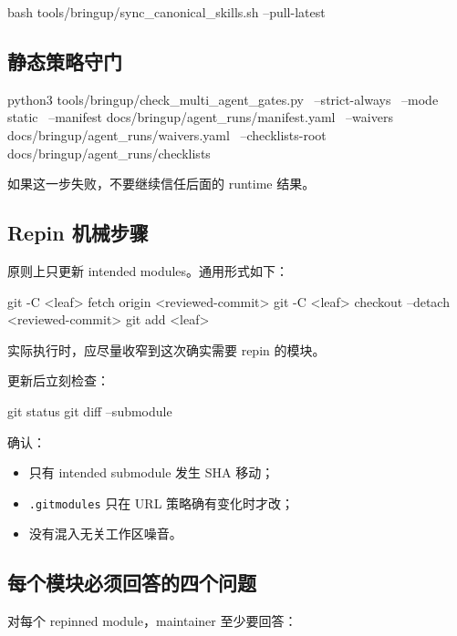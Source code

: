 \documentclass[UTF8,11pt,a4paper]{ctexart}
\begin{document}
\begin{CodeBlock}
bash tools/bringup/sync_canonical_skills.sh --pull-latest
\end{CodeBlock}

\subsection{静态策略守门}

\begin{CodeBlock}
python3 tools/bringup/check_multi_agent_gates.py \
  --strict-always \
  --mode static \
  --manifest docs/bringup/agent_runs/manifest.yaml \
  --waivers docs/bringup/agent_runs/waivers.yaml \
  --checklists-root docs/bringup/agent_runs/checklists
\end{CodeBlock}

如果这一步失败，不要继续信任后面的 runtime 结果。

\subsection{Repin 机械步骤}

原则上只更新 intended modules。通用形式如下：

\begin{CodeBlock}
git -C <leaf> fetch origin <reviewed-commit>
git -C <leaf> checkout --detach <reviewed-commit>
git add <leaf>
\end{CodeBlock}

实际执行时，应尽量收窄到这次确实需要 repin 的模块。

更新后立刻检查：

\begin{CodeBlock}
git status
git diff --submodule
\end{CodeBlock}

确认：

\begin{itemize}
  \item 只有 intended submodule 发生 SHA 移动；
  \item \texttt{.gitmodules} 只在 URL 策略确有变化时才改；
  \item 没有混入无关工作区噪音。
\end{itemize}

\subsection{每个模块必须回答的四个问题}

对每个 repinned module，maintainer 至少要回答：
\end{document}
